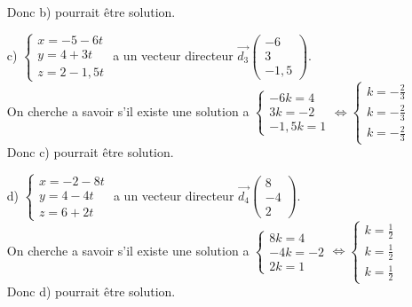 \documentclass[a4paper, 12pt]{article}
\begin{document}
\begin{itemize}
    \\Donc b) pourrait être solution. \vspace{5mm}
    \item[c)] $\begin{cases} x = -5 - 6t \\ y = 4 + 3t \\ z = 2-1,5t \end{cases}$ a un vecteur directeur $\vec{d_3}\begin{pmatrix} -6 \\ 3 \\ -1,5 \end{pmatrix}$. 
    \\On cherche a savoir s'il existe une solution a $\begin{cases} -6k = 4 \\ 3k = -2 \\ -1,5k = 1 \end{cases} \Leftrightarrow \begin{cases} k = -\frac{2}{3} \\ k = -\frac{2}{3} \\k = -\frac{2}{3} \end{cases}$ 
    \\Donc c) pourrait être solution. \vspace{5mm}
    \item[d)] $\begin{cases} x = -2 - 8t \\ y = 4 - 4t \\ z = 6 + 2t \end{cases}$ a un vecteur directeur $\vec{d_4}\begin{pmatrix} 8 \\ -4 \\ 2 \end{pmatrix}$. 
    \\On cherche a savoir s'il existe une solution a $\begin{cases} 8k = 4 \\-4k = -2 \\ 2k = 1 \end{cases} \Leftrightarrow \begin{cases} k = \frac{1}{2} \\ k = \frac{1}{2} \\k = \frac{1}{2} \end{cases}$
    \\Donc d) pourrait être solution. \vspace{5mm}
\end{itemize}
\end{document}
